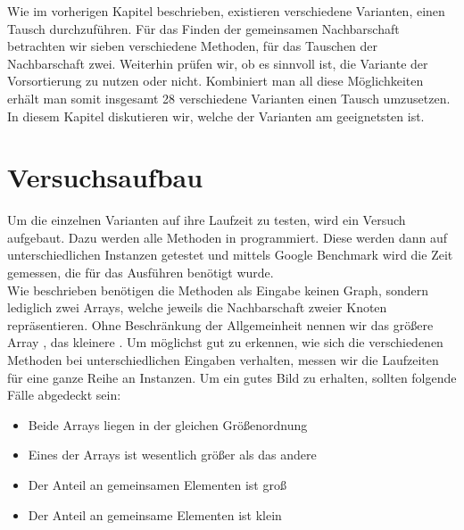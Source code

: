 \label{cap:tests}
Wie im vorherigen Kapitel beschrieben, existieren verschiedene Varianten, einen \gc{} Tausch 
durchzuführen. Für das Finden der gemeinsamen Nachbarschaft betrachten wir sieben verschiedene Methoden, 
für das Tauschen der Nachbarschaft zwei. Weiterhin prüfen wir, ob es sinnvoll ist, 
die Variante der Vorsortierung zu nutzen oder nicht.
Kombiniert man all diese Möglichkeiten erhält man somit insgesamt 28 verschiedene Varianten einen \gc{} 
Tausch umzusetzen.
In diesem Kapitel diskutieren wir, welche der Varianten am geeignetsten ist.

\section{Versuchsaufbau}
Um die einzelnen Varianten auf ihre Laufzeit zu testen, wird ein Versuch aufgebaut.
Dazu werden alle Methoden in \cpp programmiert. Diese werden dann auf unterschiedlichen
Instanzen getestet und mittels Google Benchmark \cite{benchmark} wird die Zeit gemessen, 
die für das Ausführen benötigt wurde.
\\

Wie beschrieben benötigen die Methoden als Eingabe keinen Graph, 
sondern lediglich zwei Arrays, welche jeweils die Nachbarschaft zweier Knoten repräsentieren. Ohne 
Beschränkung der Allgemeinheit nennen wir das größere Array , das kleinere .
Um möglichst gut zu erkennen, wie sich die verschiedenen Methoden bei unterschiedlichen
Eingaben verhalten, messen wir die Laufzeiten für eine ganze Reihe an Instanzen. 
Um ein gutes Bild zu erhalten, sollten folgende Fälle abgedeckt sein:

\begin{itemize}
	\item Beide Arrays liegen in der gleichen Größenordnung
	
	\item Eines der Arrays ist wesentlich größer als das andere
	
	\item Der Anteil an gemeinsamen Elementen ist groß
	
	\item Der Anteil an gemeinsame Elementen  ist klein
\end{itemize}

